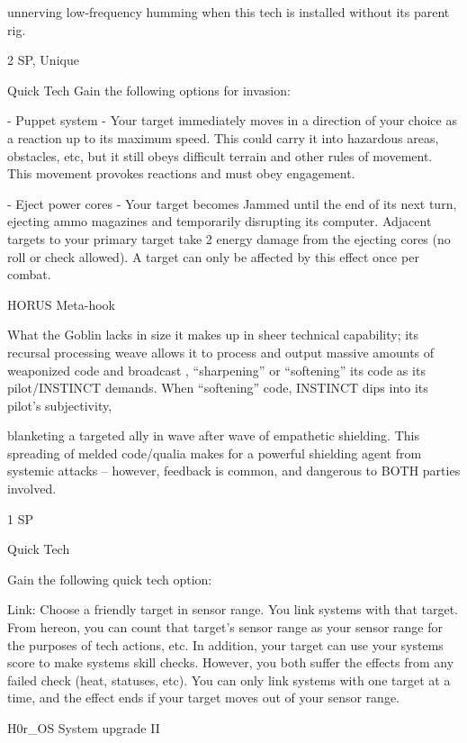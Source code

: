 unnerving low-frequency humming when this tech is installed without its parent rig.

2 SP, Unique

Quick Tech
Gain the following options for invasion:

     -   Puppet system - Your target immediately moves in a direction of your choice as a
         reaction up to its maximum speed. This could carry it into hazardous areas, obstacles,
         etc, but it still obeys difficult terrain and other rules of movement. This movement
         provokes reactions and must obey engagement.

     -   Eject power cores - Your target becomes Jammed until the end of its next turn, ejecting
         ammo magazines and temporarily disrupting its computer. Adjacent targets to your
         primary target take 2 energy damage from the ejecting cores (no roll or check allowed). A
         target can only be affected by this effect once per combat.


HORUS Meta-hook




What the Goblin lacks in size it makes up in sheer technical capability; its recursal processing weave allows
it to process and output massive amounts of weaponized code and broadcast , “sharpening” or “softening”
its code as its pilot/INSTINCT demands. When “softening” code, INSTINCT dips into its pilot’s subjectivity,

blanketing a targeted ally in wave after wave of empathetic shielding. This spreading of melded code/qualia
makes for a powerful shielding agent from systemic attacks -- however, feedback is common, and
dangerous to BOTH parties involved.

1 SP

Quick Tech

Gain the following quick tech option:

         Link: Choose a friendly target in sensor range. You link systems with that target. From
         hereon, you can count that target’s sensor range as your sensor range for the purposes of
        tech actions, etc. In addition, your target can use your systems score to make systems
        skill checks. However, you both suffer the effects from any failed check (heat, statuses,
        etc). You can only link systems with one target at a time, and the effect ends if your target
         moves out of your sensor range.


H0r\_OS System upgrade II

